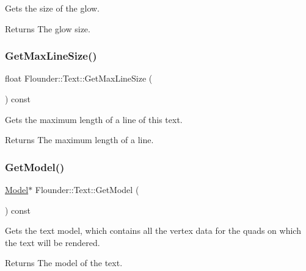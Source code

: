 Gets the size of the glow. 

\begin{DoxyReturn}{Returns}
The glow size. 
\end{DoxyReturn}
\mbox{\label{class_flounder_1_1_text_aafcc661625f84c790e27f5c8178f060f}} 
\subsubsection{\texorpdfstring{Get\+Max\+Line\+Size()}{GetMaxLineSize()}}
{\footnotesize\ttfamily float Flounder\+::\+Text\+::\+Get\+Max\+Line\+Size (\begin{DoxyParamCaption}{ }\end{DoxyParamCaption}) const\hspace{0.3cm}{\ttfamily [inline]}}



Gets the maximum length of a line of this text. 

\begin{DoxyReturn}{Returns}
The maximum length of a line. 
\end{DoxyReturn}
\mbox{\label{class_flounder_1_1_text_a807a324dca3c047f7499c1b4049192c2}} 
\subsubsection{\texorpdfstring{Get\+Model()}{GetModel()}}
{\footnotesize\ttfamily \hyperlink{class_flounder_1_1_model}{Model}$\ast$ Flounder\+::\+Text\+::\+Get\+Model (\begin{DoxyParamCaption}{ }\end{DoxyParamCaption}) const\hspace{0.3cm}{\ttfamily [inline]}}



Gets the text model, which contains all the vertex data for the quads on which the text will be rendered. 

\begin{DoxyReturn}{Returns}
The model of the text. 
\end{DoxyReturn}
\mbox{\label{class_flounder_1_1_text_a76282907c0ace6f9d807a346c201d3fc}} 
